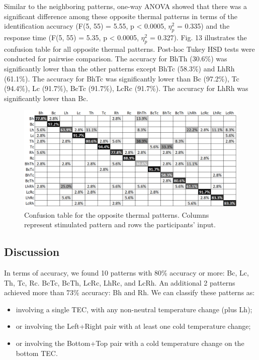 \documentclass[preprint,12pt]{elsarticle}
\begin{document}
Similar to the neighboring patterns, one-way ANOVA showed that there was a significant difference among these opposite thermal patterns in terms of the identification accuracy (F(5, 55) = 5.55, p < 0.0005, $\eta_p^2$ = 0.335) and the response time (F(5, 55) = 5.35, p < 0.0005, $\eta_p^2$ = 0.327). Fig. 13 illustrates the confusion table for all opposite thermal patterns. Post-hoc Tukey HSD tests were conducted for pairwise comparison. The accuracy for BhTh (30.6\%) was significantly lower than the other patterns except BhTc (58.3\%) and LhRh (61.1\%). The accuracy for BhTc was significantly lower than Bc (97.2\%), Tc (94.4\%), Lc (91.7\%), BcTc (91.7\%), LcRc (91.7\%). The accuracy for LhRh was significantly lower than Bc.


\begin{figure}[tp]
  \centering
  \includegraphics[width=0.9\columnwidth]{img/fig13.png}
  \caption{Confusion table for the opposite thermal patterns. Columns represent stimulated pattern and rows the participants' input.}
  \label{fig:13}
\end{figure}

\subsection{Discussion}
In terms of accuracy, we found 10 patterns with 80\% accuracy or more: Bc, Lc, Th, Tc, Rc. BcTc, BcTh, LcRc, LhRc, and LcRh. An additional 2 patterns achieved more than 73\% accuracy: Bh and Rh. We can classify these patterns as:

\begin{itemize}
\item involving a single TEC, with any non-neutral temperature change (plus Lh);
\item or involving the Left+Right pair with at least one cold temperature change;
\item or involving the Bottom+Top pair with a cold temperature change on the bottom TEC.
\end{itemize}
\end{document}
